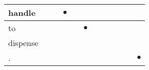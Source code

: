 \documentclass[landscape]{article}
\newcommand{\ssp}{\hspace{2pt}}
\newcommand{\mex}{\cellcolor{g}$\bullet$}
\begin{document}
\begin{tabular}{|l|p{10pt}|p{10pt}|p{10pt}|p{10pt}|p{10pt}|p{10pt}|p{10pt}|p{10pt}|p{10pt}|p{10pt}|p{10pt}|}
\hline
\ssp \cellcolor{ref2}handle \ssp&\hspace{2pt}&\hspace{2pt}&\hspace{2pt}\mex&\hspace{2pt}&\hspace{2pt}&\hspace{2pt}&\hspace{2pt}&\hspace{2pt}&\hspace{2pt}&\hspace{2pt}&\hspace{2pt}\\
\hline
\ssp \cellcolor{ref4}to \ssp&\hspace{2pt}&\hspace{2pt}&\hspace{2pt}&\hspace{2pt}&\hspace{2pt}\mex&\hspace{2pt}&\hspace{2pt}&\hspace{2pt}&\hspace{2pt}&\hspace{2pt}&\hspace{2pt}\\
\hline
\ssp dispense \ssp&\hspace{2pt}&\hspace{2pt}&\hspace{2pt}&\hspace{2pt}&\hspace{2pt}&\hspace{2pt}&\hspace{2pt}&\hspace{2pt}&\hspace{2pt}&\hspace{2pt}&\hspace{2pt}\\
\hline
\ssp \cellcolor{ref10}. \ssp&\hspace{2pt}&\hspace{2pt}&\hspace{2pt}&\hspace{2pt}&\hspace{2pt}&\hspace{2pt}&\hspace{2pt}&\hspace{2pt}&\hspace{2pt}&\hspace{2pt}&\hspace{2pt}\mex\\
\hline
\end{tabular}
\end{document}
